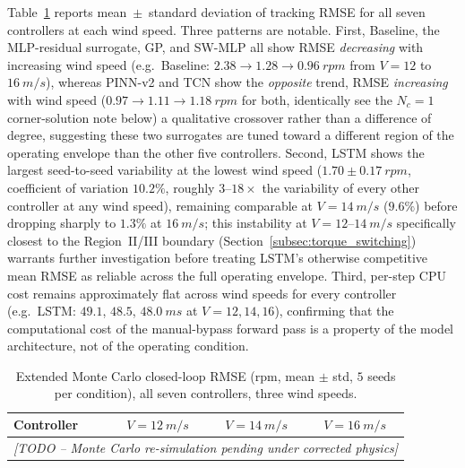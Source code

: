 Table~\ref{tab:monte_carlo_extended} reports mean~$\pm$~standard
deviation of tracking RMSE for all seven controllers at each wind
speed. Three patterns are notable. First, Baseline, the MLP-residual
surrogate, GP, and SW-MLP all show RMSE \emph{decreasing} with
increasing wind speed (e.g.\ Baseline: $2.38\rightarrow1.28\rightarrow
\SI{0.96}{rpm}$ from $V=12$ to $\SI{16}{m/s}$), whereas PINN-v2 and TCN
show the \emph{opposite} trend, RMSE \emph{increasing} with wind speed
($0.97\rightarrow1.11\rightarrow\SI{1.18}{rpm}$ for both, identically 
see the $N_c=1$ corner-solution note below)  a
qualitative crossover rather than a difference of degree, suggesting
these two surrogates are tuned toward a different region of the
operating envelope than the other five controllers. Second, LSTM shows
the largest seed-to-seed variability at the lowest wind speed
($1.70\pm\SI{0.17}{rpm}$, coefficient of variation $10.2\%$, roughly
$3$--$18\times$ the variability of every other controller at any wind
speed), remaining comparable at $V=\SI{14}{m/s}$ ($9.6\%$) before dropping
sharply to $1.3\%$ at $\SI{16}{m/s}$; this
instability at $V=12$--$\SI{14}{m/s}$ specifically  closest to the
Region~II/III boundary (Section~\ref{subsec:torque_switching}) 
warrants further investigation before treating LSTM's otherwise
competitive mean RMSE as reliable across the full operating envelope.
Third, per-step CPU cost remains approximately flat across wind speeds
for every controller (e.g.\ LSTM: $49.1$, $48.5$, $\SI{48.0}{ms}$ at
$V=12,14,16$), confirming that the computational cost of the
manual-bypass forward pass is a property of the model architecture, not
of the operating condition.

\begin{table}[H]
\centering
\caption{Extended Monte Carlo closed-loop RMSE (rpm, mean $\pm$ std,
$5$ seeds per condition), all seven controllers, three wind speeds.}
\label{tab:monte_carlo_extended}
\begin{tabular}{lccc}
\toprule
Controller & $V=\SI{12}{m/s}$ & $V=\SI{14}{m/s}$ & $V=\SI{16}{m/s}$ \\
\midrule
\multicolumn{4}{c}{\emph{[TODO -- Monte Carlo re-simulation pending under corrected physics]}} \\
\bottomrule
\end{tabular}
\end{table}

